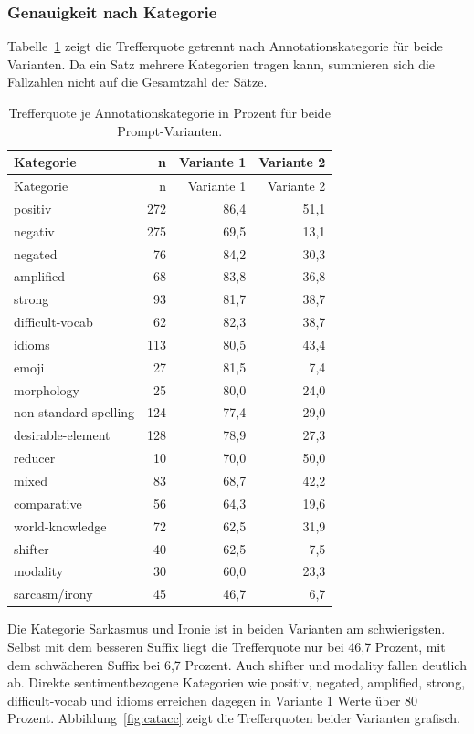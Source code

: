 \subsubsection{Genauigkeit nach Kategorie}

Tabelle~\ref{tab:catacc} zeigt die Trefferquote getrennt nach Annotationskategorie für beide Varianten. Da ein Satz mehrere Kategorien tragen kann, summieren sich die Fallzahlen nicht auf die Gesamtzahl der Sätze.

\begin{longtable}{lrrr}
  \caption{Trefferquote je Annotationskategorie in Prozent für beide Prompt-Varianten.}
  \label{tab:catacc} \\
  \toprule
  Kategorie & n & Variante 1 & Variante 2 \\
  \midrule
  \endfirsthead
  \toprule
  Kategorie & n & Variante 1 & Variante 2 \\
  \midrule
  \endhead
  \bottomrule
  \endfoot
  positiv & 272 & 86,4 & 51,1 \\
  negativ & 275 & 69,5 & 13,1 \\
  negated & 76 & 84,2 & 30,3 \\
  amplified & 68 & 83,8 & 36,8 \\
  strong & 93 & 81,7 & 38,7 \\
  difficult-vocab & 62 & 82,3 & 38,7 \\
  idioms & 113 & 80,5 & 43,4 \\
  emoji & 27 & 81,5 & 7,4 \\
  morphology & 25 & 80,0 & 24,0 \\
  non-standard spelling & 124 & 77,4 & 29,0 \\
  desirable-element & 128 & 78,9 & 27,3 \\
  reducer & 10 & 70,0 & 50,0 \\
  mixed & 83 & 68,7 & 42,2 \\
  comparative & 56 & 64,3 & 19,6 \\
  world-knowledge & 72 & 62,5 & 31,9 \\
  shifter & 40 & 62,5 & 7,5 \\
  modality & 30 & 60,0 & 23,3 \\
  sarcasm/irony & 45 & 46,7 & 6,7 \\
\end{longtable}

Die Kategorie Sarkasmus und Ironie ist in beiden Varianten am schwierigsten. Selbst mit dem besseren Suffix liegt die Trefferquote nur bei 46,7 Prozent, mit dem schwächeren Suffix bei 6,7 Prozent. Auch shifter und modality fallen deutlich ab. Direkte sentimentbezogene Kategorien wie positiv, negated, amplified, strong, difficult-vocab und idioms erreichen dagegen in Variante 1 Werte über 80 Prozent. Abbildung~\ref{fig:catacc} zeigt die Trefferquoten beider Varianten grafisch.

